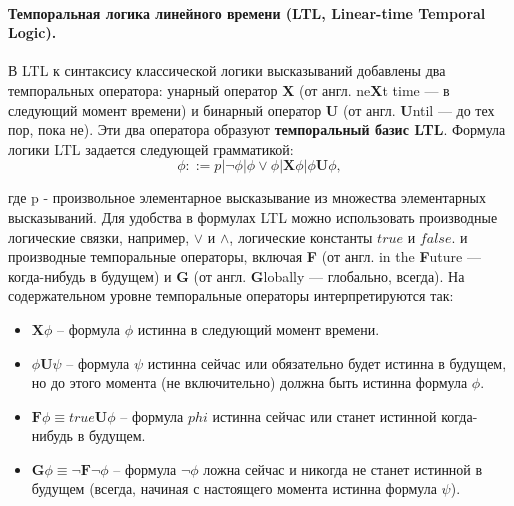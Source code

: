 \paragraph{\textbf{Темпоральная логика} линейного времени (LTL, Linear-time Temporal Logic).} 
\text{}
\newline
В LTL к синтаксису классической логики высказываний добавлены два темпоральных оператора: унарный оператор \textbf{X} (от англ. ne\textbf{X}t time — в следующий момент времени) и бинарный оператор \textbf{U} (от англ. \textbf{U}ntil — до тех пор, пока не). 
Эти два оператора образуют \textbf{темпоральный базис LTL}. 
Формула логики LTL задается следующей грамматикой:
\begin{equation}
  \phi ::= p | \neg \phi | \phi \vee \phi  |  \textbf{X}\phi | \phi \textbf{U} \phi,
\end{equation}

где p - произвольное элементарное высказывание из множества элементарных высказываний.
Для удобства в формулах LTL можно использовать производные логические связки, например, $\vee$ и $\wedge$, логические константы \textit{$true$}  и  \textit{$false$}. и производные темпоральные операторы, включая \textbf{F} (от англ. in the \textbf{F}uture — когда-нибудь в будущем) и \textbf{G} (от англ. \textbf{G}lobally — глобально, всегда). На содержательном уровне темпоральные операторы интерпретируются так: 

\begin{itemize}
	\item $\textbf{X}\phi$ -- формула $\phi$ истинна в следующий момент времени.
	\item $\phi\textbf{U}\psi$ -- формула $\psi$ истинна сейчас или $\textbf{обязательно}$ будет истинна в $\textbf{будущем}$, но до этого момента (не включительно) должна быть истинна формула $\phi$.
	\item $\textbf{F}\phi \equiv \textit{true} \textbf{U} \phi$ -- формула $phi$ истинна сейчас или станет истинной когда-нибудь в будущем. 
	\item $\textbf{G}\phi \equiv \neg \textbf{F} \neg \phi$ -- формула $\neg \phi$ ложна сейчас и никогда не станет истинной в $\textit{будущем}$ ($\textit{всегда}$, начиная с настоящего момента истинна формула $\psi$).
\end{itemize}






